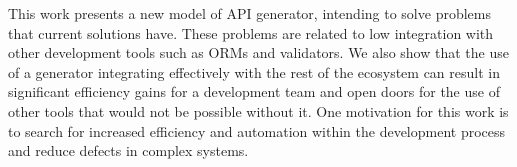 This work presents a new model of API generator, intending to solve problems that
current solutions have. These problems are related to low integration with other
development tools such as ORMs and validators. We also show that the use of a
generator integrating effectively with the rest of the ecosystem can result in
significant efficiency gains for a development team and open doors for the use of
other tools that would not be possible without it. One motivation for this work
is to search for increased efficiency and automation within the development process
and reduce defects in complex systems.
